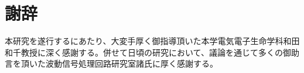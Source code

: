 \chapter*{謝辞}
本研究を遂行するにあたり、大変手厚く御指導頂いた本学電気電子生命学科和田和千教授に深く感謝する。併せて日頃の研究において、議論を通じて多くの御助言を頂いた波動信号処理回路研究室諸氏に厚く感謝する。

\makesignature
